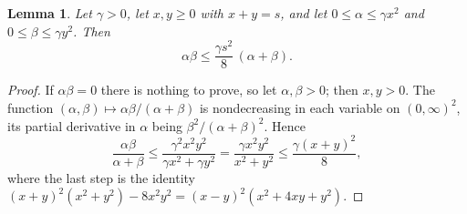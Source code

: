 \documentclass[11pt]{amsart}
\numberwithin{equation}{section}
\newtheorem{lemma}[theorem]{Lemma}
\theoremstyle{remark}
\begin{document}
\begin{lemma}\label{lem:twomass}
Let $\gamma>0$, let $x,y\ge0$ with $x+y=s$, and let $0\le\alpha\le\gamma x^2$ and $0\le\beta\le\gamma y^2$. Then
\[
\alpha\beta\le\frac{\gamma s^2}8\,(\alpha+\beta).
\]
\end{lemma}

\begin{proof}
If $\alpha\beta=0$ there is nothing to prove, so let $\alpha,\beta>0$; then $x,y>0$. The function $(\alpha,\beta)\mapsto\alpha\beta/(\alpha+\beta)$ is nondecreasing in each variable on $(0,\infty)^2$, its partial derivative in $\alpha$ being $\beta^2/(\alpha+\beta)^2$. Hence
\[
\frac{\alpha\beta}{\alpha+\beta}\le\frac{\gamma^2x^2y^2}{\gamma x^2+\gamma y^2}=\frac{\gamma x^2y^2}{x^2+y^2}\le\frac{\gamma(x+y)^2}8,
\]
where the last step is the identity $(x+y)^2(x^2+y^2)-8x^2y^2=(x-y)^2(x^2+4xy+y^2)$.
\end{proof}
\end{document}
